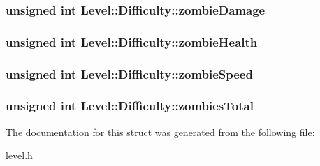 \hypertarget{structLevel_1_1Difficulty_a59adf3184823a740957e78f62d39c6df}{
\subsubsection[{zombie\-Damage}]{\setlength{\rightskip}{0pt plus 5cm}unsigned int Level\-::\-Difficulty\-::zombie\-Damage}}\label{structLevel_1_1Difficulty_a59adf3184823a740957e78f62d39c6df}
\hypertarget{structLevel_1_1Difficulty_a3c4e883253dcd88fa5f221b2684d22ba}{
\subsubsection[{zombie\-Health}]{\setlength{\rightskip}{0pt plus 5cm}unsigned int Level\-::\-Difficulty\-::zombie\-Health}}\label{structLevel_1_1Difficulty_a3c4e883253dcd88fa5f221b2684d22ba}
\hypertarget{structLevel_1_1Difficulty_ad9dfcb0694df92389e64e5a9a2e7316e}{
\subsubsection[{zombie\-Speed}]{\setlength{\rightskip}{0pt plus 5cm}unsigned int Level\-::\-Difficulty\-::zombie\-Speed}}\label{structLevel_1_1Difficulty_ad9dfcb0694df92389e64e5a9a2e7316e}
\hypertarget{structLevel_1_1Difficulty_adde47502037079e2c1552140e1aecbe0}{
\subsubsection[{zombies\-Total}]{\setlength{\rightskip}{0pt plus 5cm}unsigned int Level\-::\-Difficulty\-::zombies\-Total}}\label{structLevel_1_1Difficulty_adde47502037079e2c1552140e1aecbe0}


The documentation for this struct was generated from the following file\-:\begin{DoxyCompactItemize}
\item 
\hyperlink{level_8h}{level.\-h}\end{DoxyCompactItemize}
